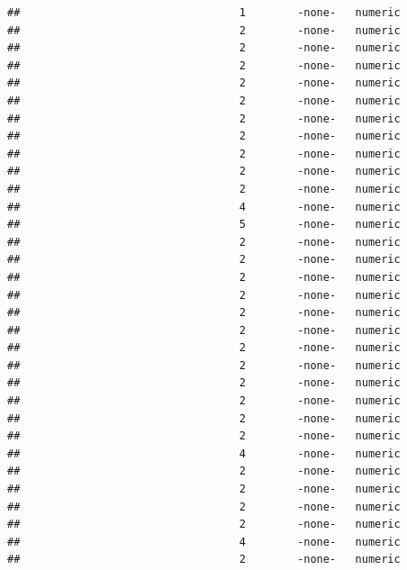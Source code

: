 \documentclass[
  12pt,
]{article}
\begin{document}
\begin{verbatim}
##                                  1        -none-   numeric                    
##                                  2        -none-   numeric                    
##                                  2        -none-   numeric                    
##                                  2        -none-   numeric                    
##                                  2        -none-   numeric                    
##                                  2        -none-   numeric                    
##                                  2        -none-   numeric                    
##                                  2        -none-   numeric                    
##                                  2        -none-   numeric                    
##                                  2        -none-   numeric                    
##                                  2        -none-   numeric                    
##                                  4        -none-   numeric                    
##                                  5        -none-   numeric                    
##                                  2        -none-   numeric                    
##                                  2        -none-   numeric                    
##                                  2        -none-   numeric                    
##                                  2        -none-   numeric                    
##                                  2        -none-   numeric                    
##                                  2        -none-   numeric                    
##                                  2        -none-   numeric                    
##                                  2        -none-   numeric                    
##                                  2        -none-   numeric                    
##                                  2        -none-   numeric                    
##                                  2        -none-   numeric                    
##                                  2        -none-   numeric                    
##                                  4        -none-   numeric                    
##                                  2        -none-   numeric                    
##                                  2        -none-   numeric                    
##                                  2        -none-   numeric                    
##                                  2        -none-   numeric                    
##                                  4        -none-   numeric                    
##                                  2        -none-   numeric                    

\end{verbatim}
\end{document}
